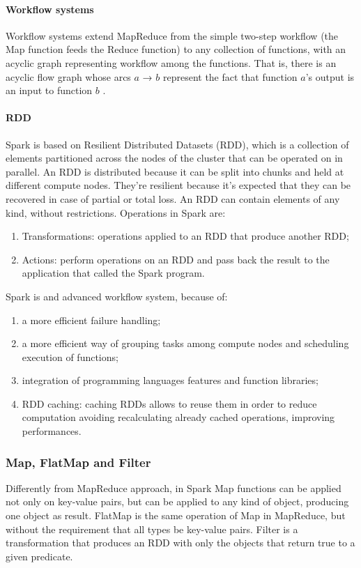 \documentclass[\main/main.tex]{subfiles}
\begin{document}
\paragraph{Workflow systems}Workflow systems extend MapReduce from the simple two-step workflow (the Map function feeds the Reduce function) to any collection of functions, with an acyclic graph representing workflow among the functions. That is, there is an acyclic flow graph whose arcs $a$ → $b$ represent the fact that function $a$’s output is an input to function $b$ \cite{leskovec_rajaraman_ullman_2020}.
\paragraph{RDD} Spark is based on Resilient Distributed Datasets (RDD), which is a collection of elements partitioned across the nodes of the cluster that can be operated on in parallel. An RDD is distributed because it can be split into chunks and held at different compute nodes. They're resilient because it's expected that they can be recovered in case of partial or total loss. An RDD can contain elements of any kind, without restrictions.
Operations in Spark are:
\begin{enumerate}
    \item Transformations: operations applied to an RDD that produce another RDD;
    \item Actions: perform operations on an RDD and pass back the result to the application that called the Spark program.
\end{enumerate}
Spark is and advanced workflow system, because of:
\begin{enumerate}
    \item a more efficient failure handling;
    \item a more efficient way of grouping tasks among compute nodes and scheduling execution of functions;
    \item integration of programming languages features and function libraries;
    \item RDD caching: caching RDDs allows to reuse them in order to reduce computation avoiding recalculating already cached operations, improving performances. 
\end{enumerate}
\subsubsection{Map, FlatMap and Filter}
Differently from MapReduce approach, in Spark Map functions can be applied not only on key-value pairs, but can be applied to any kind of object, producing one object as result. 
FlatMap is the same operation of Map in MapReduce, but without the requirement that all types be key-value pairs. Filter is a transformation that produces an RDD with only the objects that return true to a given predicate.
\end{document}

